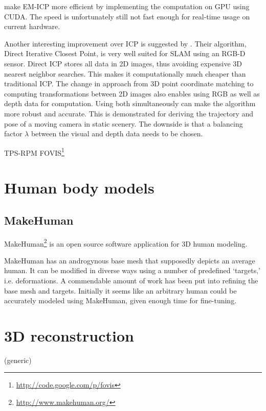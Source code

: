 \citet{tamaki2010softassign} make EM-ICP more efficient by implementing the computation on GPU using CUDA. The speed is unfortunately still not fast enough for real-time usage on current hardware.

Another interesting improvement over ICP is suggested by \citet{tykkala2011direct}. Their algorithm, Direct Iterative Closest Point, is very well suited for SLAM using an RGB-D sensor. Direct ICP stores all data in 2D images, thus avoiding expensive 3D nearest neighbor searches. This makes it computationally much cheaper than traditional ICP. The change in approach from 3D point coordinate matching to computing transformations between 2D images also enables using RGB as well as depth data for computation. Using both simultaneously can make the algorithm more robust and accurate. This is demonstrated for deriving the trajectory and pose of a moving camera in static scenery. The downside is that a balancing factor $\lambda$ between the visual and depth data needs to be chosen.

\citep{chui2003new} TPS-RPM
\citep{huang2011visual} FOVIS\footnote{\url{http://code.google.com/p/fovis}}


\section{Human body models}
\citep{anguelov2005scape}
\citep{baek2012parametric}

\subsection{MakeHuman}


MakeHuman\footnote{\url{http://www.makehuman.org/}} is an open source software application for 3D human modeling.

MakeHuman has an androgynous base mesh that supposedly depicts an average human. It can be modified in diverse ways using a number of predefined `targets,' i.e. deformations. A commendable amount of work has been put into refining the base mesh and targets. Initially it seems like an arbitrary human could be accurately modeled using MakeHuman, given enough time for fine-tuning.

\section{3D reconstruction}
(generic)
\citep{fabio2003point}

